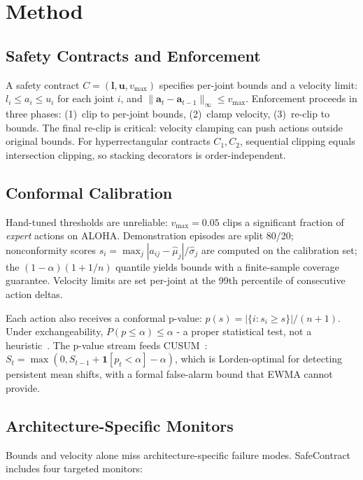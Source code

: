 \documentclass[conference]{IEEEtran}
\begin{document}
\section{Method}
\label{sec:method}

\subsection{Safety Contracts and Enforcement}

A safety contract $C = (\mathbf{l}, \mathbf{u}, v_{\max})$ specifies per-joint bounds and a velocity limit:
$l_i \leq a_i \leq u_i$ for each joint $i$, and $\|\mathbf{a}_t - \mathbf{a}_{t-1}\|_\infty \leq v_{\max}$.
Enforcement proceeds in three phases: (1)~clip to per-joint bounds, (2)~clamp velocity, (3)~re-clip to bounds.
The final re-clip is critical: velocity clamping can push actions outside original bounds.
For hyperrectangular contracts $C_1, C_2$, sequential clipping equals intersection clipping, so stacking decorators is order-independent.

\subsection{Conformal Calibration}
\label{sec:calibration}

Hand-tuned thresholds are unreliable: $v_{\max}{=}0.05$ clips a significant fraction of \emph{expert} actions on ALOHA.
Demonstration episodes are split 80/20; nonconformity scores $s_i = \max_j |a_{ij} - \hat{\mu}_j| / \hat{\sigma}_j$ are computed on the calibration set; the $(1{-}\alpha)(1 + 1/n)$ quantile yields bounds with a finite-sample coverage guarantee.
Velocity limits are set per-joint at the 99th percentile of consecutive action deltas.

Each action also receives a conformal p-value: $p(s) = |\{i : s_i \ge s\}| / (n+1)$.
Under exchangeability, $P(p \le \alpha) \le \alpha$ - a proper statistical test, not a heuristic~\cite{vovk2005}.
The p-value stream feeds CUSUM~\cite{page1954}: $S_t = \max(0, S_{t-1} + \mathbf{1}[p_t < \alpha] - \alpha)$, which is Lorden-optimal for detecting persistent mean shifts, with a formal false-alarm bound that EWMA cannot provide.

\subsection{Architecture-Specific Monitors}
\label{sec:monitors}

Bounds and velocity alone miss architecture-specific failure modes.
SafeContract includes four targeted monitors:
\end{document}
